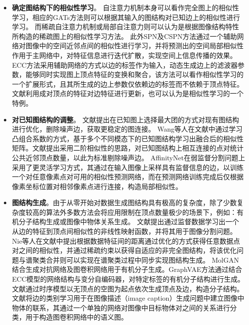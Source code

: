 \begin{itemize}
    \item {\bf{确定图结构下的相似性学习}}。
    自注意力机制\cite{vaswani2017attention,wang2018non}本身可以看作完全图上的相似性学习，相应的GATs方法\cite{velivckovic2017graph}则可以根据其输入的图结构对已知边上的相似性进行学习。
    而稀疏自注意力机制\cite{child2019generating,huang2019interlaced}或局部自注意力\cite{ramachandran2019stand}则可以认为是根据图像结构特性所构造的稀疏图上的相似性学习方法。
    此外SPN\cite{liu2017learning}及CSPN\cite{cheng2018depth}方法通过一个辅助网络对图像中的空间近邻点间的相似性进行学习，并将预测出的空间局部相似性作用于主网络中，对特征信息进行迭代扩散，实现空间上信息传播的效果。
    ECC方法\cite{simonovsky2017dynamic}采用辅助网络的方式以边的标签作为输入，动态生成边上的滤波器参数，能够同时实现图上顶点特征的变换和聚合，该方法可以看作相似性学习的一个扩展形式，且其所生成的边上参数仅依赖边的标签而不依赖于顶点特征。文献\parencite{kearnes2016molecular}利用成对顶点的特征对边特征进行更新，也可以认为是相似性学习的一个特例。    
    \item {\bf{对已知图结构的调整}}。
    文献\parencite{pavan2007dominant}提出在已知图上选择最大团的方式对现有图结构进行优化，删除噪声边，获取更稳定的图连接。
    Wang等人在文献\parencite{wang2009unified}中通过学习凸组合系数的方式，基于多个不同模态下的已知图结构学习出融合后的相似性矩阵。文献\parencite{premachandran2013consensus}提出采用二阶相似性的思路，对已知图结构上相互连接的点对统计公共近邻顶点数量，以此为标准剔除噪声边。
    AffinityNet\cite{ahn2018learning}在弱监督分割问题上采用了更灵活学习方式，其通过在输入图像上采样具有监督信息的边，以训练一个对任意像素点对可用的相似性预测网络，而在预测网络训练完成后仅根据像素坐标位置对相邻像素点进行连接，构造局部相似性。    
    \item {\bf{图结构生成}}。由于从零开始对数据生成图结构具有极高的复杂度，除了少数复杂度较高的算法外多数方法会将应用限制在顶点数量极少的场景下，例如：有机分子结构生成或图像中物体关系生成。
    文献\parencite{meila2001learning}提出通过监督数据学习出一个从边的特征到顶点间相似性的非线性映射函数，并将其用于图像分割问题。
    Nie等人在文献\parencite{nie2014clustering}中提出根据数据特征间的距离通过优化的方式获得任意数据点对之间的相似性，并通过稀疏约束以获得自适应的非完全图结构，将该优化问题与谱聚类合并则可以实现在谱聚类过程中同步实现图结构生成。
    MolGAN\cite{de2018molgan}结合生成对抗网络\cite{goodfellow2014generative}及图卷积网络\cite{kipf2016semi}用于有机分子生成。GraphVAE方法\cite{simonovsky2018graphvae}通过结合ECC模型\cite{simonovsky2017dynamic}的网络结构与变分自编码器，对特定标签的有机分子结构进行生成。文献\parencite{li2018learning}通过时序模型以无顶点的空图为起点依次生成顶点及边，构造分子结构。文献\parencite{yao2018exploring}将边的类别学习用于在图像描述（image caption）生成问题中建立图像中物体的联系，其通过一个单独的网络对图像中目标物体对之间的关系进行分类，用于构造图卷积网络中的语义图。
\end{itemize}


